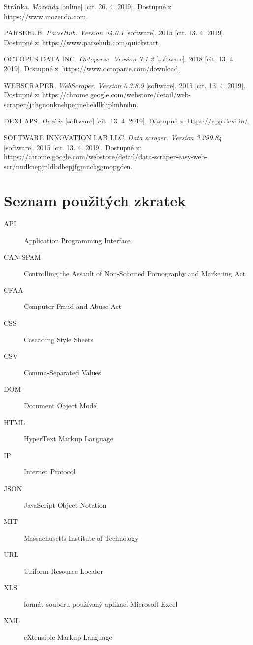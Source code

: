 \documentclass[thesis=B,czech]{FITthesis}[2012/06/26]
\begin{document}
\begin{thebibliography}{99}
	Stránka. \textit{Mozenda} [online] [cit. 26. 4. 2019]. Dostupné z \url{https://www.mozenda.com}.
	
	PARSEHUB. \textit{ParseHub. Version 54.0.1} [software]. 2015 [cit. 13. 4. 2019]. Dostupné z: \url{https://www.parsehub.com/quickstart}.
	
	OCTOPUS DATA INC. \textit{Octoparse. Version 7.1.2} [software]. 2018 [cit. 13. 4. 2019]. Dostupné z: \url{https://www.octoparse.com/download}.
	
	WEBSCRAPER. \textit{WebScraper. Version 0.3.8.9} [software]. 2016 [cit. 13. 4. 2019]. Dostupné z: \url{https://chrome.google.com/webstore/detail/web-scraper/jnhgnonknehpejjnehehllkliplmbmhn}.
	
	DEXI APS. \textit{Dexi.io} [software] [cit. 13. 4. 2019]. Dostupné z: \url{https://app.dexi.io/}.
	
	 SOFTWARE INNOVATION LAB LLC. \textit{Data scraper. Version 3.299.84} [software]. 2015 [cit. 13. 4. 2019]. Dostupné z: \url{https://chrome.google.com/webstore/detail/data-scraper-easy-web-scr/nndknepjnldbdbepjfgmncbggmopgden}.
	
\end{thebibliography}

\appendix




\chapter{Seznam použitých zkratek}
\begin{description}
	\item[API] Application Programming Interface
	\item[CAN-SPAM] Controlling the Assault of Non-Solicited Pornography and Marketing Act
	\item[CFAA] Computer Fraud and Abuse Act
	\item[CSS] Cascading Style Sheets
	\item[CSV] Comma-Separated Values
	\item[DOM] Document Object Model
	\item[HTML] HyperText Markup Language
	\item[IP] Internet Protocol
	\item[JSON] JavaScript Object Notation
	\item[MIT] Massachusetts Institute of Technology
	\item[URL] Uniform Resource Locator
	\item[XLS] formát souboru používaný aplikací Microsoft Excel
	\item[XML] eXtensible Markup Language
\end{description}
\end{document}
